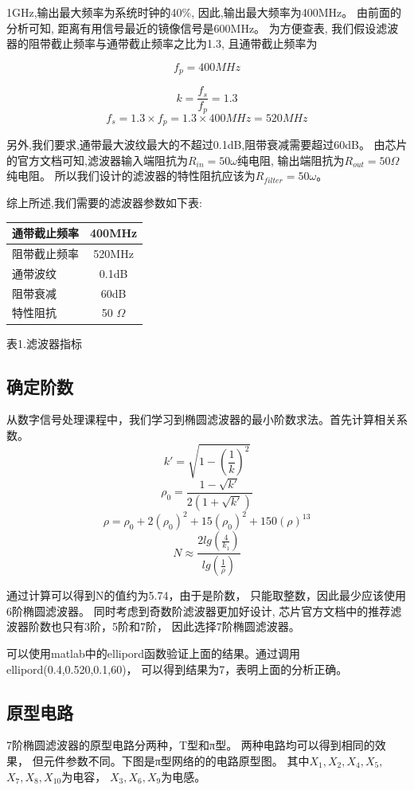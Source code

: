 \documentclass{article}
\begin{document}
\begin{CJK}{UTF8}{gbsn}
1GHz,输出最大频率为系统时钟的40\%,
因此,输出最大频率为400MHz。
由前面的分析可知,
距离有用信号最近的镜像信号是600MHz。
为方便查表,
我们假设滤波器的阻带截止频率与通带截止频率之比为1.3,
且通带截止频率为

\[
f_p=400MHz
\]

\[
k=\frac{f_s}{f_p}=1.3
\]
\[
f_s=1.3 \times f_p=1.3 \times 400MHz=520MHz
\]

另外,我们要求,通带最大波纹最大的不超过0.1dB,阻带衰减需要超过60dB。
由芯片的官方文档可知,滤波器输入端阻抗为\(R_{in}=50 \omega\)纯电阻, 
输出端阻抗为\(R_{out}=50Ω\)纯电阻。
所以我们设计的滤波器的特性阻抗应该为\(R_{filter} = 50 \omega\)。

综上所述,我们需要的滤波器参数如下表:

\begin{center}
\begin{tabular}{l | c}
通带截止频率 & 400MHz \\
\hline
阻带截止频率 & 520MHz \\
\hline
通带波纹 & 0.1dB \\
\hline
阻带衰减 & 60dB \\
\hline
特性阻抗 & 50 \(\Omega\) \\
\end{tabular}

表1.滤波器指标
\end{center}


\subsection{确定阶数}
\qquad 从数字信号处理课程中，我们学习到椭圆滤波器的最小阶数求法。首先计算相关系数。
\[
k'=\sqrt{1-(\frac{1}{k})^2}
\]
\[
\rho_0 = \frac{1-\sqrt{k'}}{2(1+\sqrt{k'})}
\]
\[
\rho = \rho_0+2(\rho_0)^2+15(\rho_0)^2+150(\rho)^13
\]
\[
N \approx \frac{2lg(\frac{4}{k_1})}{lg(\frac{1}{\rho})}
\]

通过计算可以得到N的值约为5.74，由于是阶数，
只能取整数，因此最少应该使用6阶椭圆滤波器。
同时考虑到奇数阶滤波器更加好设计,
芯片官方文档中的推荐滤波器阶数也只有3阶，5阶和7阶，
因此选择7阶椭圆滤波器。

可以使用matlab中的ellipord函数验证上面的结果。通过调用ellipord(0.4,0.520,0.1,60)，
可以得到结果为7，表明上面的分析正确。

\subsection{原型电路}
\qquad 7阶椭圆滤波器的原型电路分两种，T型和π型。
两种电路均可以得到相同的效果，
但元件参数不同。下图是π型网络的的电路原型图。
其中\(X_1,X_2,X_4,X_5,\)
\(X_7,X_8,X_{10}\)为电容，
\(X_3,X_6,X_9\)为电感。


\end{CJK}
\end{document}

